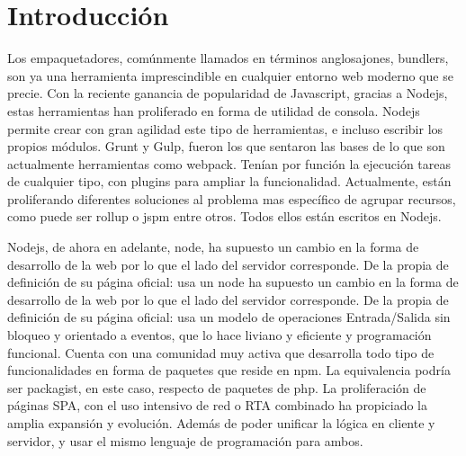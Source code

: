 \section{Introducci\'on}
\item Los empaquetadores, comúnmente llamados en términos anglosajones, bundlers, son ya una herramienta imprescindible en cualquier entorno web moderno que se precie. Con la reciente ganancia de popularidad de Javascript, gracias a Nodejs, estas herramientas han proliferado en forma de utilidad de consola. Nodejs permite crear con gran agilidad este tipo de herramientas, e incluso escribir los propios módulos.
Grunt y Gulp, fueron los que sentaron las bases de lo que son actualmente herramientas como webpack. Tenían por función la ejecución tareas de cualquier tipo, con plugins para ampliar la funcionalidad. Actualmente, están proliferando diferentes soluciones al problema mas específico de agrupar recursos, como puede ser rollup o jspm entre otros. Todos ellos están escritos en Nodejs.\\

\item Nodejs, de ahora en adelante, node, ha supuesto un cambio en la forma de desarrollo de la web por lo que el lado del servidor corresponde. De la propia de definición de su página oficial: usa un node ha supuesto un cambio en la forma de desarrollo de la web por lo que el lado del servidor corresponde. De la propia de definición de su página oficial: usa un  modelo de operaciones Entrada/Salida sin bloqueo y orientado a eventos, que lo hace liviano y eficiente y programación funcional. Cuenta con una comunidad muy activa que desarrolla todo tipo de funcionalidades en forma de paquetes que reside en npm. La equivalencia podría ser packagist, en este caso, respecto de paquetes de php.  La proliferación de páginas SPA, con el uso intensivo de red o RTA combinado ha propiciado la amplia expansión y evolución. Además de poder unificar la lógica en  cliente y servidor, y usar el mismo lenguaje de programación para ambos.
